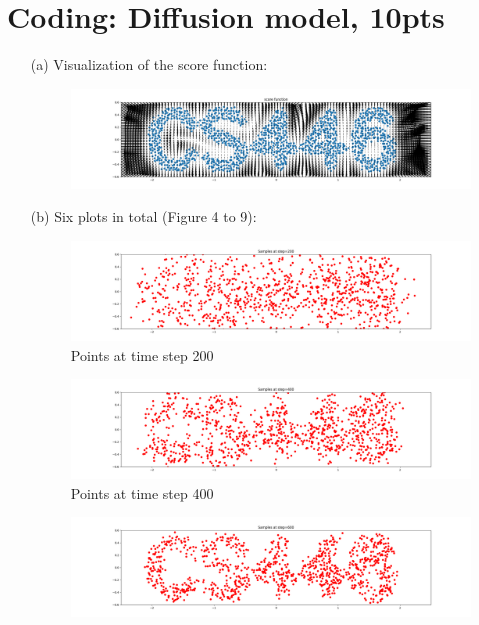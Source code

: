 \documentclass[12pt]{article}
\begin{document}
\section{Coding: Diffusion model, 10pts}
\begin{enumerate}
    \item[(a)] Visualization of the score function:
    \begin{figure}[!h]
        \centering
        \includegraphics[width=\linewidth]{score}
    \end{figure}
    \item[(b)] Six plots in total (Figure 4 to 9):
    \begin{figure}[!h]
        \centering
        \includegraphics[width=\linewidth]{step_200}
        \caption{Points at time step 200}
    \end{figure}
    \begin{figure}[!h]
        \centering
        \includegraphics[width=\linewidth]{step_400}
        \caption{Points at time step 400}
    \end{figure}
    \newpage
    \begin{figure}[!h]
        \centering
        \includegraphics[width=\linewidth]{step_600}

\end{figure}
\end{enumerate}
\end{document}
